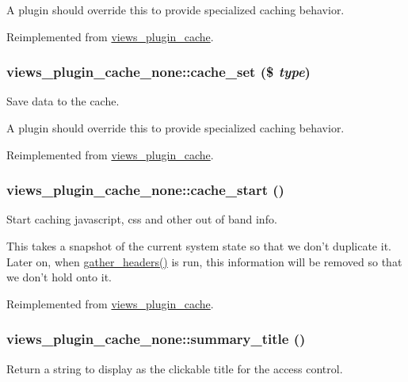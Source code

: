 A plugin should override this to provide specialized caching behavior. 

Reimplemented from \hyperlink{classviews__plugin__cache_a77d1ef6d62d4eb84209cf310194b173b}{views\_\-plugin\_\-cache}.\hypertarget{classviews__plugin__cache__none_a0c66f7c812356a9327ec968c7de6dc47}{
\subsubsection[{cache\_\-set}]{\setlength{\rightskip}{0pt plus 5cm}views\_\-plugin\_\-cache\_\-none::cache\_\-set (\$ {\em type})}}
\label{classviews__plugin__cache__none_a0c66f7c812356a9327ec968c7de6dc47}
Save data to the cache.

A plugin should override this to provide specialized caching behavior. 

Reimplemented from \hyperlink{classviews__plugin__cache_a4089f1652603b3e1012a8b0f00407c05}{views\_\-plugin\_\-cache}.\hypertarget{classviews__plugin__cache__none_a17f65a53d00a8c51865027c3bce8172a}{
\subsubsection[{cache\_\-start}]{\setlength{\rightskip}{0pt plus 5cm}views\_\-plugin\_\-cache\_\-none::cache\_\-start ()}}
\label{classviews__plugin__cache__none_a17f65a53d00a8c51865027c3bce8172a}
Start caching javascript, css and other out of band info.

This takes a snapshot of the current system state so that we don't duplicate it. Later on, when \hyperlink{classviews__plugin__cache_a557cef7540eec7d0a6ad9cd030724ef7}{gather\_\-headers()} is run, this information will be removed so that we don't hold onto it. 

Reimplemented from \hyperlink{classviews__plugin__cache_aa59c91a728401e1a49857346ae665ce7}{views\_\-plugin\_\-cache}.\hypertarget{classviews__plugin__cache__none_a52838d0e7db62b5e92f837df6a4931b9}{
\subsubsection[{summary\_\-title}]{\setlength{\rightskip}{0pt plus 5cm}views\_\-plugin\_\-cache\_\-none::summary\_\-title ()}}
\label{classviews__plugin__cache__none_a52838d0e7db62b5e92f837df6a4931b9}
Return a string to display as the clickable title for the access control. 

